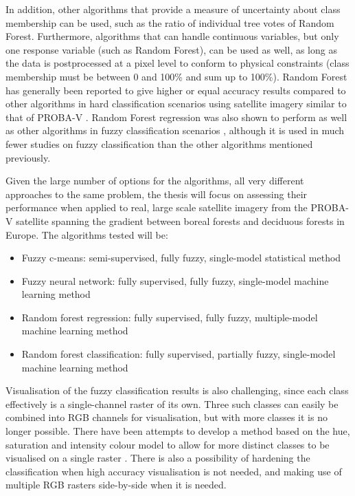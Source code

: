 \documentclass[a4paper,10pt]{article}
\begin{document}
In addition, other algorithms that provide a measure of uncertainty about class membership can be used, such as the ratio of individual tree votes of Random Forest. Furthermore, algorithms that can handle continuous variables, but only one response variable (such as Random Forest), can be used as well, as long as the data is postprocessed at a pixel level to conform to physical constraints (class membership must be between 0 and 100\% and sum up to 100\%). Random Forest has generally been reported to give higher or equal accuracy results compared to other algorithms in hard classification scenarios using satellite imagery similar to that of PROBA-V \cite{duro2012algorithmcomparison}. Random Forest regression was also shown to perform as well as other algorithms in fuzzy classification scenarios \cite{walton2008subpixelrf}, although it is used in much fewer studies on fuzzy classification than the other algorithms mentioned previously.

Given the large number of options for the algorithms, all very different approaches to the same problem, the thesis will focus on assessing their performance when applied to real, large scale satellite imagery from the PROBA-V satellite spanning the gradient between boreal forests and deciduous forests in Europe. The algorithms tested will be:

\begin{itemize}
 \item Fuzzy c-means: semi-supervised, fully fuzzy, single-model statistical method
 \item Fuzzy neural network: fully supervised, fully fuzzy, single-model machine learning method
 \item Random forest regression: fully supervised, fully fuzzy, multiple-model machine learning method
 \item Random forest classification: fully supervised, partially fuzzy, single-model machine learning method
\end{itemize}

Visualisation of the fuzzy classification results is also challenging, since each class effectively is a single-channel raster of its own. Three such classes can easily be combined into RGB channels for visualisation, but with more classes it is no longer possible. There have been attempts to develop a method based on the hue, saturation and intensity colour model to allow for more distinct classes to be visualised on a single raster \cite{hengl2004fuzzycmeans}. There is also a possibility of hardening the classification when high accuracy visualisation is not needed, and making use of multiple RGB rasters side-by-side when it is needed.
\end{document}
